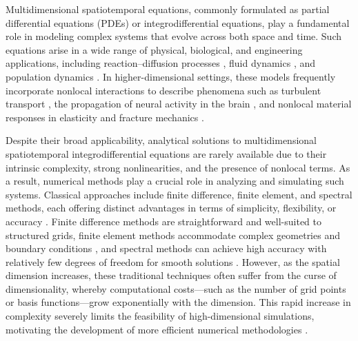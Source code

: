 Multidimensional spatiotemporal equations, commonly formulated as partial differential equations (PDEs) or integrodifferential equations, play a fundamental role in modeling complex systems that evolve across both space and time. Such equations arise in a wide range of physical, biological, and engineering applications, including reaction–diffusion processes \cite{murray2002mathematical}, fluid dynamics \cite{batchelor2000introduction}, and population dynamics \cite{perthame2007transport}. In higher-dimensional settings, these models frequently incorporate nonlocal interactions to describe phenomena such as turbulent transport \cite{pope2000turbulent}, the propagation of neural activity in the brain \cite{ermentrout1998neural}, and nonlocal material responses in elasticity and fracture mechanics \cite{silling2000reformulation}.

Despite their broad applicability, analytical solutions to multidimensional spatiotemporal integrodifferential equations are rarely available due to their intrinsic complexity, strong nonlinearities, and the presence of nonlocal terms. As a result, numerical methods play a crucial role in analyzing and simulating such systems. Classical approaches include finite difference, finite element, and spectral methods, each offering distinct advantages in terms of simplicity, flexibility, or accuracy \cite{trefethen2000spectral,johnson2012finite}. Finite difference methods are straightforward and well-suited to structured grids, finite element methods accommodate complex geometries and boundary conditions \cite{zienkiewicz2005finite}, and spectral methods can achieve high accuracy with relatively few degrees of freedom for smooth solutions \cite{boyd2001chebyshev}. However, as the spatial dimension increases, these traditional techniques often suffer from the curse of dimensionality, whereby computational costs—such as the number of grid points or basis functions—grow exponentially with the dimension. This rapid increase in complexity severely limits the feasibility of high-dimensional simulations, motivating the development of more efficient numerical methodologies \cite{hackbusch2012tensor}.


